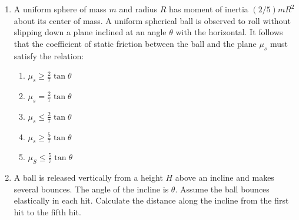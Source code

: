 \documentclass[12pt,letterpaper]{article}
\begin{document}
\begin{enumerate}[resume]
\item
A uniform sphere of mass $m$ and radius $R$ has moment of inertia $\left(2/5\right)mR^2$ about its center of mass. A uniform spherical ball is observed to roll without slipping down a plane inclined at an angle $\theta$ with the horizontal. It follows that the coefficient of static friction between the ball and the plane $\mu_s$ must satisfy the relation:
\begin{enumerate}
\item $\displaystyle \mu_s \geq \frac{2}{7}\tan\theta$
\item $\displaystyle \mu_s = \frac{2}{7}\tan\theta$
\item $\displaystyle \mu_s \leq \frac{2}{7}\tan\theta$
\item $\displaystyle \mu_s \geq \frac{5}{7}\tan\theta$
\item $\displaystyle \mu_S \leq \frac{5}{7}\tan\theta$
\end{enumerate}




\item
A ball is released vertically from a height $H$ above an incline and makes several bounces. The angle of the incline is $\theta$. Assume the ball bounces elastically in each hit. Calculate the distance along the incline from the first hit to the fifth hit.

\begin{tabular}{l r}


\end{tabular}
\end{enumerate}
\end{document}
